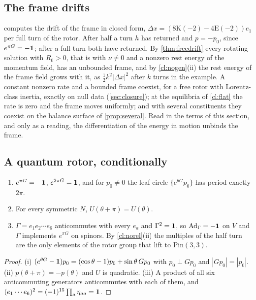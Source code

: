 \subsection{The frame drifts}
\label{sec:restdrift}

 computes the drift of the frame in closed form, $\Delta x=(8\mathrm K(-2)-4\mathrm E(-2))e_1$ per full turn of the rotor. After half a
turn $h$ has returned and $p=-p_0$, since $e^{\pi G}=-\mathbf 1$; after a full turn both have returned. By \cref{thm:freedrift} every rotating solution
with $R_0>0$, that is with $\nu\neq0$ and a nonzero rest energy of the momentum field, has an unbounded frame, and by \cref{cl:nogen}(ii) the rest energy of the frame field grows with
it, as $\tfrac12k^2|\Delta x|^2$ after $k$ turns in the example. A constant nonzero rate and a bounded frame coexist, for a free rotor with
Lorentz-class inertia, exactly on null data (\cref{sec:closure}); at the equilibria of \cref{cl:flat} the rate is zero and the frame moves
uniformly; and with several constituents they coexist on the balance surface of \cref{prop:several}. Read in the terms of this section, and only as a reading, the differentiation
of the energy in motion unbinds the frame.

\subsection{A quantum rotor, conditionally}
\label{sec:restquantum}

\begin{proposition}
\label{cl:halfturn}
\begin{enumerate}[label=(\roman*),leftmargin=2.2em]
\item $e^{\pi G}=-\mathbf 1$, $e^{2\pi G}=\mathbf 1$, and for $p_0\neq0$ the leaf circle $\{e^{\theta G}p_0\}$ has period exactly $2\pi$.
\item For every symmetric $N$, $U(\theta+\pi)=U(\theta)$.
\item $\Gamma=e_1e_2\cdots e_6$ anticommutes with every $e_a$ and $\Gamma^2=\mathbf 1$, so $\operatorname{Ad}_\Gamma=-\mathbf 1$ on $V$ and $\Gamma$ implements $e^{\pi G}$ on
spinors. By \cref{cl:norel}(ii) the multiples of the half turn are the only elements of the rotor group that lift to $\mathrm{Pin}(3,3)$.
\end{enumerate}
\end{proposition}

\begin{proof}
(i) $(e^{\theta G}-\mathbf 1)p_0=(\cos\theta-1)p_0+\sin\theta\,Gp_0$ with $p_0\perp Gp_0$ and $|Gp_0|=|p_0|$. (ii) $p(\theta+\pi)=-p(\theta)$ and $U$ is
quadratic. (iii) A product of all six anticommuting generators anticommutes with each of them, and
$(e_1\cdots e_6)^2=(-1)^{15}\prod_a\eta_{aa}=\mathbf 1$.
\end{proof}

